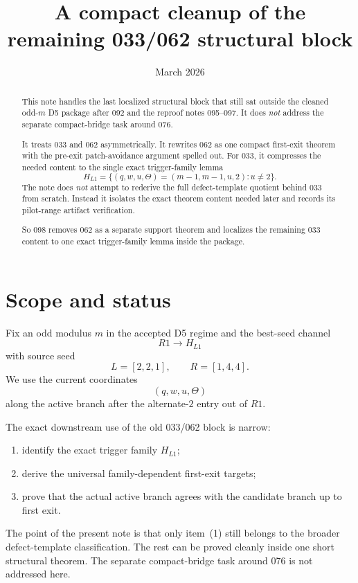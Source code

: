 \documentclass[11pt]{article}
\title{A compact cleanup of the remaining 033/062 structural block}
\author{}
\date{March 2026}
\begin{document}
\maketitle

\begin{abstract}
This note handles the last localized structural block that still sat outside the
cleaned odd-$m$ D5 package after 092 and the reproof notes 095--097.
It does \emph{not} address the separate compact-bridge task around 076.

It treats 033 and 062 asymmetrically.
It rewrites 062 as one compact first-exit theorem with the pre-exit
patch-avoidance argument spelled out.
For 033, it compresses the needed content to the single exact trigger-family
lemma
\[
H_{L1}=\{(q,w,u,\Theta)=(m-1,m-1,u,2):u\neq 2\}.
\]
The note does \emph{not} attempt to rederive the full defect-template quotient
behind 033 from scratch.
Instead it isolates the exact theorem content needed later and records its
pilot-range artifact verification.

So 098 removes 062 as a separate support theorem and localizes the remaining
033 content to one exact trigger-family lemma inside the package.
\end{abstract}

\section{Scope and status}

Fix an odd modulus $m$ in the accepted D5 regime and the best-seed channel
\[
R1 \to H_{L1}
\]
with source seed
\[
L=[2,2,1], \qquad R=[1,4,4].
\]
We use the current coordinates
\[
(q,w,u,\Theta)
\]
along the active branch after the alternate-$2$ entry out of $R1$.

The exact downstream use of the old 033/062 block is narrow:
\begin{enumerate}[label=\textup{(\arabic*)},leftmargin=2.5em]
\item identify the exact trigger family $H_{L1}$;
\item derive the universal family-dependent first-exit targets;
\item prove that the actual active branch agrees with the candidate branch up
      to first exit.
\end{enumerate}

The point of the present note is that only item~(1) still belongs to the
broader defect-template classification. The rest can be proved cleanly inside
one short structural theorem. The separate compact-bridge task around 076 is
not addressed here.
\end{document}
